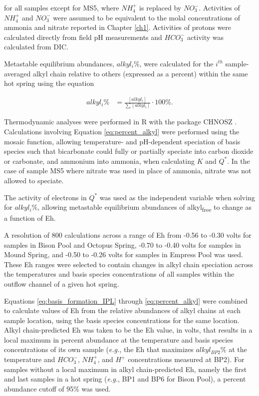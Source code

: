 \noindent for all samples except for MS5, where $NH_{4}^{+}$ is replaced by $NO_{3}^{-}$. Activities of $NH_{4}^{+}$ and $NO_{3}^{-}$ were assumed to be equivalent to the molal concentrations of ammonia and nitrate reported in Chapter \ref{ch1}. Activities of protons were calculated directly from field pH measurements and $HCO_{3}^{-}$ activity was calculated from DIC.

Metastable equilibrium abundances, $alkyl_{i}\%$, were calculated for the $i^{th}$ sample-averaged alkyl chain relative to others (expressed as a percent) within the same hot spring using the equation

\begin{equation} \label{eq:percent_alkyl}
\begin{split}
alkyl_{i}\% & = \frac{[alkyl_{i}]}{\sum{[alkyl_{i}]}} \cdot 100\%.
\end{split}
\end{equation}

Thermodynamic analyses were performed in R with the package CHNOSZ \citep{dick2008calculation}. Calculations involving Equation \ref{eq:percent_alkyl} were performed using the mosaic function, allowing temperature- and pH-dependent speciation of basis species such that bicarbonate could fully or partially speciate into carbon dioxide or carbonate, and ammonium into ammonia, when calculating $K$ and $Q^{*}$. In the case of sample MS5 where nitrate was used in place of ammonia, nitrate was not allowed to speciate.

The activity of electrons in $Q^{*}$ was used as the independent variable when solving for $alkyl_{i}\%$, allowing metastable equilibrium abundances of alkyl\textsubscript{free} to change as a function of Eh.

A resolution of 800 calculations across a range of Eh from -0.56 to -0.30 volts for samples in Bison Pool and Octopus Spring, -0.70 to -0.40 volts for samples in Mound Spring, and -0.50 to -0.26 volts for samples in Empress Pool was used. These Eh ranges were selected to contain changes in alkyl chain speciation across the temperatures and basis species concentrations of all samples within the outflow channel of a given hot spring.

Equations \ref{eq:basis_formation_IPL} through \ref{eq:percent_alkyl} were combined to calculate values of Eh from the relative abundances of alkyl chains at each sample location, using the basis species concentrations for the same location. Alkyl chain-predicted Eh was taken to be the Eh value, in volts, that results in a local maximum in percent abundance at the temperature and basis species concentrations of its own sample (\textit{e.g.}, the Eh that maximizes $alkyl_{BP2}\%$ at the temperature and $HCO_{3}^{-}$, $NH_{4}^{+}$, and $H^{+}$ concentrations measured at BP2). For samples without a local maximum in alkyl chain-predicted Eh, namely the first and last samples in a hot spring (\textit{e.g.}, BP1 and BP6 for Bison Pool), a percent abundance cutoff of 95\% was used.

